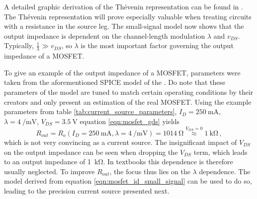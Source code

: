 A detailed graphic derivation of the Thévenin representation can be found in \cite{fet_equations}. The Thévenin representation will prove especially valuable when treating circuits with a resistance in the source leg.
The small-signal model now shows that the output impedance is dependent on the channel-length modulation $\lambda$ and $v_{DS}$. Typically, $\frac{1}{\lambda} \gg v_{DS}$, so $\lambda$ is the most important factor governing the output impedance of a MOSFET.

To give an example of the output impedance of a MOSFET, parameters were taken from the aforementioned SPICE model of the . Do note that these parameters of the model are tuned to match certain operating conditions by their creators and only present an estimation of the real MOSFET. Using the example parameters from table \ref{tab:current_source_parameters}, $I_D=\qty{250}{\mA}$, $\lambda = \qty[per-mode=power]{4}{\per \milli \volt}$, $V_{DS}=\qty{3.5}{\V}$ equation \ref{eqn:mosfet_gds} yields
\begin{equation}
    R_{out} = R_{o}\left(I_D=\qty{250}{\mA}, \lambda = \qty[per-mode=power]{4}{\per \milli \volt}\right) = \qty{1014}{\ohm} \overset{V_{DS} = 0}{\approx} \qty{1}{\kilo \ohm} \, , \label{eqn:mosfet_rout_irf9610}
\end{equation}
which is not very convincing as a current source. The insignificant impact of $V_{DS}$ on the output impedance can be seen when dropping the $V_{DS}$ term, which leads to an output impedance of \qty{1}{\kilo \ohm}. In textbooks this dependence is therefore usually neglected. To improve $R_{out}$, the focus thus lies on the $\lambda$ dependence. The model derived from equation \ref{eqn:mosfet_id_small_signal} can be used to do so, leading to the precision current source presented next.

